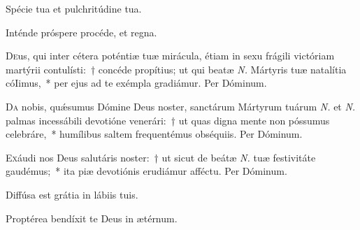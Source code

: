 \documentclass[vesperale_romanum.tex]{subfiles}
\begin{document}

\altertonus


\vel



\vv Spécie tua et pulchritúdine tua. \tpalleluia

\rr Inténde próspere procéde, et regna. \tpalleluia

\admagnificat

\label{an_simile_est_negotiatori_solesmes_1961}
{}


\lettrine{D}{e}us, qui inter cétera poténtiæ tuæ mirácula, étiam in sexu frágili vi\-ctóriam martýrii contulísti:~† concéde propítius; ut qui beatæ \textit{N.} Mártyris tuæ natalítia cóIimus,~* per ejus ad te exémpla gradiámur. Per Dóminum.


\lettrine{D}{a} nobis, quǽsumus Dómine Deus noster, san\-ctárum Mártyrum tuárum \textit{N.} et \textit{N.} palmas incessábili devotióne venerári:~† ut quas digna mente non póssumus celebráre,~* humílibus saltem frequentémus obséquiis. Per Dóminum.


\lettrine{E}{x}áudi nos Deus salutáris noster:~† ut sicut de beátæ \textit{N.} tuæ festivitáte gaudémus;~* ita piæ devotiónis erudiámur afféctu.
Per Dóminum.


\omniapraeter %

\vv Diffúsa est grátia in lábiis tuis. \tpalleluia

\rr Proptérea bendíxit te Deus in ætérnum. \tpalleluia

\admagnificat
\label{an_manum_suam_solesmes_1961}
{}
\end{document}

